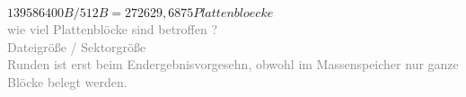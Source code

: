 \documentclass{ti2}
\begin{document}
$139586400 B / 512 B= 272629,6875 Plattenbloecke$\\
\textcolor{gray}{wie viel Plattenblöcke sind betroffen ?}\\
\textcolor{gray}{Dateigröße / Sektorgröße}\\
\textcolor{gray}{Runden ist erst beim Endergebnisvorgesehn, obwohl im Massenspeicher nur ganze Blöcke belegt werden.}\\






\end{document}
